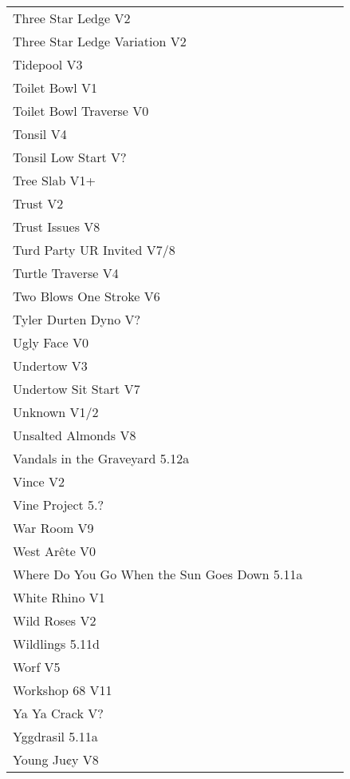 \begin{flushleft}
\begin{center}
\begin{supertabular}{p{0.76\linewidth}p{0.08\linewidth}}
Three Star Ledge V2 & \pageref{rt:Three Star Ledge} \\
Three Star Ledge Variation V2 & \pageref{vr:Three Star Ledge Variation} \\
Tidepool V3 & \pageref{rt:Tidepool} \\
Toilet Bowl V1 & \pageref{rt:Toilet Bowl} \\
Toilet Bowl Traverse V0 & \pageref{rt:Toilet Bowl Traverse} \\
Tonsil V4 & \pageref{rt:Tonsil} \\
Tonsil Low Start V? & \pageref{vr:Tonsil Low Start} \\
Tree Slab V1+ & \pageref{rt:Tree Slab} \\
Trust V2 & \pageref{rt:Trust} \\
Trust Issues V8 & \pageref{rt:Trust Issues} \\
Turd Party UR Invited V7/8 & \pageref{rt:Turd Party UR Invited} \\
Turtle Traverse V4 & \pageref{vr:Turtle Traverse} \\
Two Blows One Stroke V6 & \pageref{rt:Two Blows One Stroke} \\
Tyler Durten Dyno V? & \pageref{vr:Tyler Durten Dyno} \\
Ugly Face V0 & \pageref{rt:Ugly Face} \\
Undertow V3 & \pageref{rt:Undertow} \\
Undertow Sit Start V7 & \pageref{vr:Undertow Sit Start} \\
Unknown V1/2 & \pageref{rt:Unknown on E's Dirty B} \\
Unsalted Almonds V8 & \pageref{rt:Unsalted Almonds} \\
Vandals in the Graveyard 5.12a & \pageref{rt:Vandals in the Graveyard} \\
Vince V2 & \pageref{rt:Vince} \\
Vine Project 5.? & \pageref{rt:Vine Project} \\
War Room V9 & \pageref{rt:War Room} \\
West Arête V0 & \pageref{rt:West Arête} \\
Where Do You Go When the Sun Goes Down 5.11a & \pageref{rt:Where Do You Go When the Sun Goes Down} \\
White Rhino V1 & \pageref{rt:White Rhino} \\
Wild Roses V2 & \pageref{rt:Wild Roses} \\
Wildlings 5.11d & \pageref{rt:Wildlings} \\
Worf V5 & \pageref{rt:Worf} \\
Workshop 68 V11 & \pageref{vr:Workshop 68} \\
Ya Ya Crack V? & \pageref{rt:Ya Ya Crack} \\
Yggdrasil 5.11a & \pageref{rt:Yggdrasil} \\
Young Ju¢y V8 & \pageref{rt:Young Ju¢y} \\
\end{supertabular}
\end{center}
\needspace{1.5cm}

\end{flushleft}
